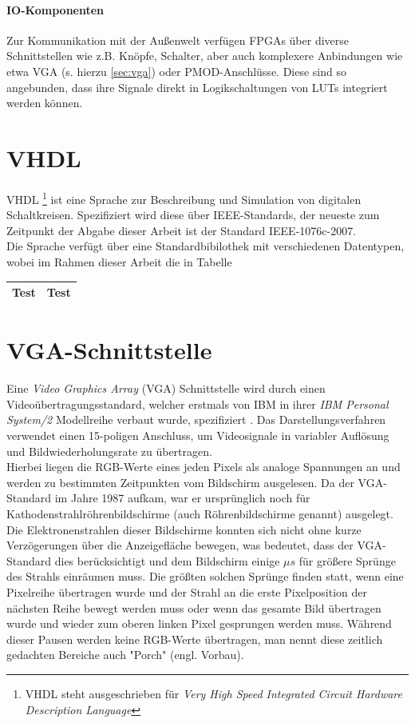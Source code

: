 \documentclass[a4paper,12pt,onesided]{report}
\begin{document}
\paragraph{IO-Komponenten}
Zur Kommunikation mit der Außenwelt verfügen FPGAs über diverse Schnittstellen wie z.B. Knöpfe, Schalter, aber auch komplexere Anbindungen wie etwa VGA (s. hierzu \autoref{sec:vga}) oder PMOD-Anschlüsse.
Diese sind so angebunden, dass ihre Signale direkt in Logikschaltungen von LUTs integriert werden können.

\section{VHDL}
\label{sec:vhdl}
VHDL \footnote{VHDL steht ausgeschrieben für \textit{Very High Speed Integrated Circuit Hardware Description Language}} ist eine Sprache zur Beschreibung und Simulation von digitalen Schaltkreisen.
Spezifiziert wird diese über IEEE-Standards, der neueste zum Zeitpunkt der Abgabe dieser Arbeit ist der Standard IEEE-1076c-2007\cite{ieeevhdl}.\\
Die Sprache verfügt über eine Standardbibilothek mit verschiedenen Datentypen, wobei im Rahmen dieser Arbeit die in Tabelle 


\begin{table}[H]
	\centering
	\begin{tabular}{|r|l|}
		\hline
		Test & Test \\ \hline
	\end{tabular}
\end{table}

\section{VGA-Schnittstelle}
\label{sec:vga}
Eine \textit{Video Graphics Array} (VGA) Schnittstelle wird durch einen Videoübertragungsstandard, welcher erstmals von IBM in ihrer \textit{IBM Personal System/2} Modellreihe verbaut wurde, spezifiziert \cite{ibmTimeline}. 
Das Darstellungsverfahren verwendet einen 15-poligen Anschluss, um Videosignale in variabler Auflösung und Bildwiederholungsrate zu übertragen.\\
Hierbei liegen die RGB-Werte eines jeden Pixels als analoge Spannungen an und werden zu bestimmten Zeitpunkten vom Bildschirm ausgelesen. 
Da der VGA-Standard im Jahre 1987 aufkam, war er ursprünglich noch für  Kathodenstrahlröhrenbildschirme (auch Röhrenbildschirme genannt) ausgelegt. 
Die Elektronenstrahlen dieser Bildschirme konnten sich nicht ohne kurze Verzögerungen über die Anzeigefläche bewegen, was bedeutet, dass der VGA-Standard dies berücksichtigt und dem Bildschirm einige $\mu s$ für größere Sprünge des Strahls einräumen muss.
Die größten solchen Sprünge finden statt, wenn eine Pixelreihe übertragen wurde und der Strahl an die erste Pixelposition der nächsten Reihe bewegt werden muss oder wenn das gesamte Bild übertragen wurde und wieder zum oberen linken Pixel gesprungen werden muss.
Während dieser Pausen werden keine RGB-Werte übertragen, man nennt diese zeitlich gedachten Bereiche auch "Porch" (engl. Vorbau).\\
\end{document}
